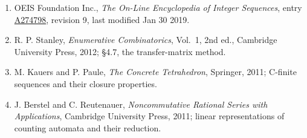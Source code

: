 \documentclass[11pt]{article}
\theoremstyle{definition}
\begin{document}
\begin{enumerate}

\item OEIS Foundation Inc., \emph{The On-Line Encyclopedia of Integer Sequences}, entry \href{https://oeis.org/A274798}{A274798}, revision 9, last modified Jan 30 2019.

\item R. P. Stanley, \emph{Enumerative Combinatorics}, Vol.~1, 2nd ed., Cambridge University Press, 2012; \S4.7, the transfer-matrix method.

\item M. Kauers and P. Paule, \emph{The Concrete Tetrahedron}, Springer, 2011; C-finite sequences and their closure properties.

\item J. Berstel and C. Reutenauer, \emph{Noncommutative Rational Series with Applications}, Cambridge University Press, 2011; linear representations of counting automata and their reduction.

\end{enumerate}
\end{document}
